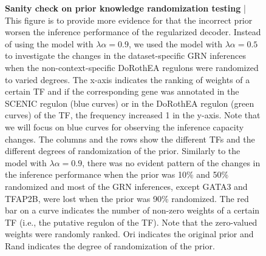 \addtocounter{figure}{-1}
\begin{figure}[t!]
    \caption{\small{\textbf{Sanity check on prior knowledge randomization testing} | This figure is to provide more evidence for that the incorrect prior worsen the inference performance of the regularized decoder. Instead of using the model with $\lambda\alpha = 0.9$, we used the model with $\lambda\alpha = 0.5$ to investigate the changes in the dataset-specific GRN inferences when the non-context-specific DoRothEA regulons were randomized to varied degrees. The x-axis indicates the ranking of weights of a certain TF and if the corresponding gene was annotated in the SCENIC regulon (blue curves) or in the DoRothEA regulon (green curves) of the TF, the frequency increased 1 in the y-axis. Note that we will focus on blue curves for observing the inference capacity changes. The columns and the rows show the different TFs and the different degrees of randomization of the prior. Similarly to the model with $\lambda\alpha = 0.9$, there was no evident pattern of the changes in the inference performance when the prior was 10\% and 50\% randomized and most of the GRN inferences, except GATA3 and TFAP2B, were lost when the prior was 90\% randomized. The red bar on a curve indicates the number of non-zero weights of a certain TF (i.e., the putative regulon of the TF). Note that the zero-valued weights were randomly ranked. Ori indicates the original prior and Rand indicates the degree of randomization of the prior.}}
\end{figure}

